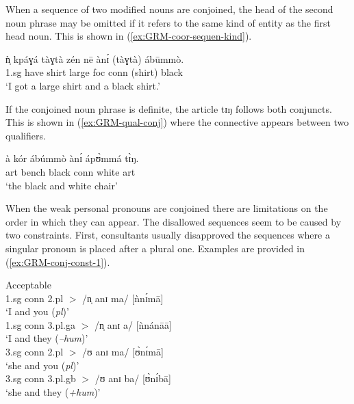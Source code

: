 \begin{exe}
\begin{exe}
\begin{exe}
{\begin{exe}
\begin{exe}
\begin{exe}
\begin{exe}
\begin{exe}
\begin{exe}
\begin{exe}
\begin{exe}
\begin{exe}
\begin{exe}
\begin{exe}
\begin{exe}
\begin{exe}
\begin{exe}
When a sequence of  two  modified nouns are conjoined, the head of the second
noun phrase may be omitted if it refers to the same kind of entity as
the first head noun. This is shown in (\ref{ex:GRM-coor-sequen-kind}).


\begin{exe}
 \ex\label{ex:GRM-coor-sequen-kind}
 
 \gll ǹ̩ kpáɣá tàɣtà zén nē ànɪ́ (tàɣtà) ábūmmò.\\
{\sc 1.sg} have shirt large  {\sc foc} {\sc conn} (shirt)  black\\
 \glt   `I got a large shirt and a black shirt.'
\z

If the conjoined noun phrase is definite, the article {\sls tɪŋ}
follows both conjuncts. This is shown in (\ref{ex:GRM-qual-conj}) where the
connective appears between two qualifiers.

\begin{exe}
 \ex\label{ex:GRM-qual-conj}
 
 \gll   à kór ábúmmò ànɪ́ ápʊ̀mmá tɪ̀ŋ.\\
{\sc art}  bench black {\sc conn} white {\sc art}\\
 \glt   `the black and white chair'
\z

When the weak personal pronouns are conjoined there are limitations on the order in which they can 
appear. The disallowed sequences seem to be caused by two constraints. First, consultants usually 
disapproved   the sequences where a singular pronoun is placed after a plural one. Examples are 
provided in (\ref{ex:GRM-conj-const-1}).



\ea\label{ex:GRM-conj-const-1}
\begin{multicols}{2}
\ea\label{ex:GRM-conj-const-1-g}{\rm Acceptable}\\
1.sg {\sc conn} 2.pl $>$ {\sls /n̩ anɪ ma/} [ǹnɪ́mā] \\
`I and you ({\it pl})'\\
1.sg {\sc conn} 3.pl.{\sc g}a  $>$   {\sls /n̩ anɪ a/} [ǹnánāā]\\
`I and they ({\it --hum})'\\
3.sg  {\sc conn} 2.pl $>$ {\sls /ʊ anɪ ma/} [ʊ̀nɪ́mā]\\
 `she and you ({\it pl})'\\
3.sg {\sc conn} 3.pl.{\sc g}b $>$   {\sls /ʊ anɪ ba/} [ʊ̀nɪ́bā]\\
`she and they ({\it +hum})'

\columnbreak 
\vfill


\end{multicols}
\end{exe}
\end{exe}
\end{exe}
\end{exe}
\end{exe}
\end{exe}
\end{exe}
\end{exe}
\end{exe}
\end{exe}
\end{exe}
\end{exe}
\end{exe}
\end{exe}
\end{exe}
\end{exe}}
\end{exe}
\end{exe}
\end{exe}
